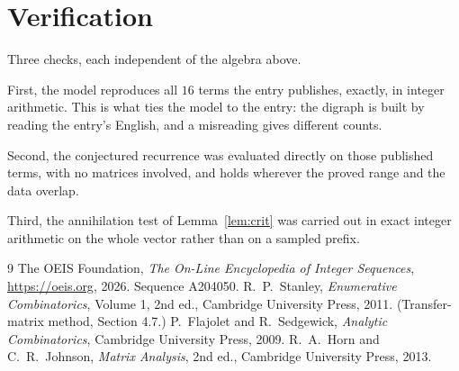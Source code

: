 \documentclass[11pt,a4paper]{article}
\theoremstyle{plain}
\theoremstyle{definition}
\begin{document}
\section{Verification}

Three checks, each independent of the algebra above.

First, the model reproduces all $16$ terms the entry publishes, exactly, in integer
arithmetic. This is what ties the model to the entry: the digraph is built by reading the
entry's English, and a misreading gives different counts.

Second, the conjectured recurrence was evaluated directly on those published terms, with no
matrices involved, and holds wherever the proved range and the data overlap.

Third, the annihilation test of Lemma~\ref{lem:crit} was carried out in exact integer
arithmetic on the whole vector rather than on a sampled prefix.

\begin{thebibliography}{9}
 The OEIS Foundation, \emph{The On-Line Encyclopedia of Integer
Sequences}, \url{https://oeis.org}, 2026. Sequence A204050.
 R.~P.~Stanley, \emph{Enumerative Combinatorics}, Volume 1, 2nd ed.,
Cambridge University Press, 2011. (Transfer-matrix method, Section 4.7.)
 P.~Flajolet and R.~Sedgewick, \emph{Analytic Combinatorics}, Cambridge
University Press, 2009.
 R.~A.~Horn and C.~R.~Johnson, \emph{Matrix Analysis}, 2nd ed., Cambridge
University Press, 2013.
\end{thebibliography}
\end{document}
